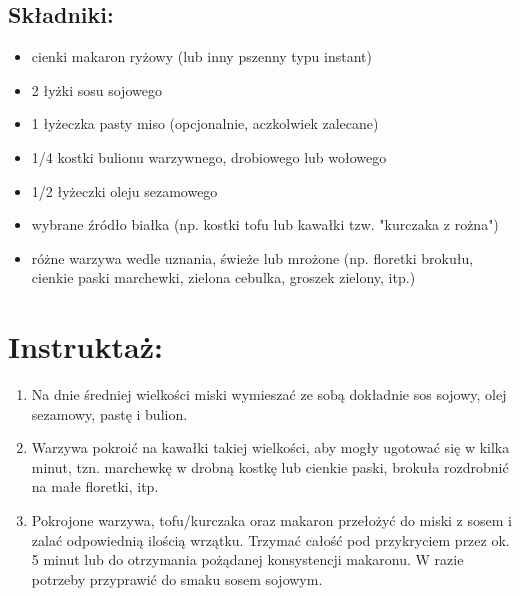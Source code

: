 \documentclass[a4paper,10pt]{book}
\begin{document}
\begin{multicols}{2}

\section*{Składniki:} \begin{itemize} 
\item cienki makaron ryżowy (lub inny pszenny typu instant) 
\item 2 łyżki sosu sojowego 
\item 1 łyżeczka pasty miso (opcjonalnie, aczkolwiek zalecane) 
\item 1/4 kostki bulionu warzywnego, drobiowego lub wołowego
\item 1/2 łyżeczki oleju sezamowego 
\item wybrane źródło białka (np. kostki tofu lub kawałki tzw. "kurczaka z rożna")
\item różne warzywa wedle uznania, świeże lub mrożone (np. floretki brokułu, cienkie paski marchewki, zielona cebulka, groszek zielony, itp.) 
\end{itemize}

\columnbreak

\begin{figure}[H]
    \centering
\end{figure}
\end{multicols}

\vspace{0.5cm} 

\section*{Instruktaż:} \begin{enumerate} 
\item Na dnie średniej wielkości miski wymieszać ze sobą dokładnie sos sojowy, olej sezamowy, pastę i bulion. 
\item Warzywa pokroić na kawałki takiej wielkości, aby mogły ugotować się w kilka minut, tzn. marchewkę w drobną kostkę lub cienkie paski, brokuła rozdrobnić na małe floretki, itp. 
\item Pokrojone warzywa, tofu/kurczaka oraz makaron przełożyć do miski z sosem i zalać odpowiednią ilością wrzątku. Trzymać całość pod przykryciem przez ok. 5 minut lub do otrzymania pożądanej konsystencji makaronu. W razie potrzeby przyprawić do smaku sosem sojowym. 
\end{enumerate}
\end{document}
